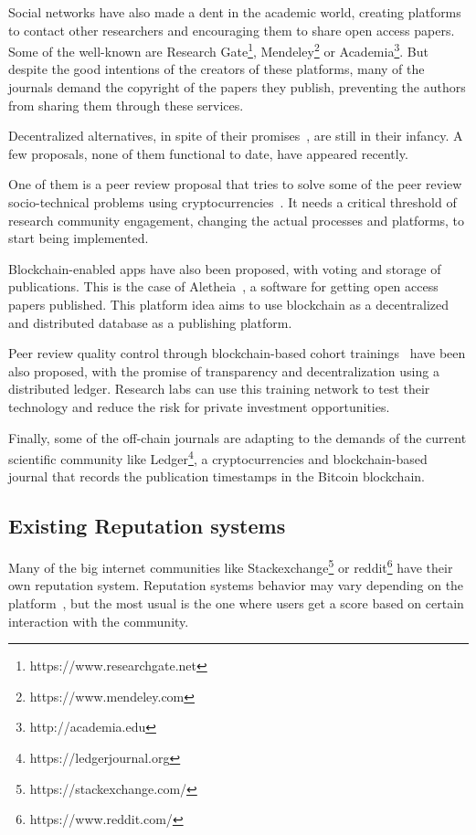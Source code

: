 Social networks have also made a dent in the academic world, creating platforms
to contact other researchers and encouraging them to share open access papers.
Some of the well-known are Research Gate\footnote{https://www.researchgate.net},
Mendeley\footnote{https://www.mendeley.com} or
Academia\footnote{http://academia.edu}. But despite the good intentions of the
creators of these platforms, many of the journals demand the copyright of the
papers they publish, preventing the authors from sharing them through these
services.


Decentralized alternatives, in spite of their
promises~\cite{bartlingblockchain}, are still in their infancy. A few proposals,
none of them functional to date, have appeared recently.

One of them is a peer review proposal that tries to solve some of the peer
review socio-technical problems using cryptocurrencies~\cite{tennant2017multi}.
It needs a critical threshold of research community engagement, changing the
actual processes and platforms, to start being implemented.

Blockchain-enabled apps have also been proposed, with voting and storage of
publications. This is the case of Aletheia~\cite{morton2017aletheia}, a software
for getting open access papers published. This platform idea aims to use
blockchain as a decentralized and distributed database as a publishing platform.

Peer review quality control through blockchain-based cohort
trainings~\cite{dhillon2016bench} have been also proposed, with the promise of
transparency and decentralization using a distributed ledger. Research labs can
use this training network to test their technology and reduce the risk for
private investment opportunities.

Finally, some of the off-chain journals are adapting to the demands of the
current scientific community like Ledger\footnote{https://ledgerjournal.org}, a
cryptocurrencies and blockchain-based journal that records the publication
timestamps in the Bitcoin blockchain.

\subsection{Existing Reputation systems}
\label{soa:rs}
Many of the big internet communities like
Stackexchange\footnote{https://stackexchange.com/} or
reddit\footnote{https://www.reddit.com/} have their own reputation system.
Reputation systems behavior may vary depending on the
platform~\cite{josang2002beta}, but the most usual is the one where users get a
score based on certain interaction with the community.


